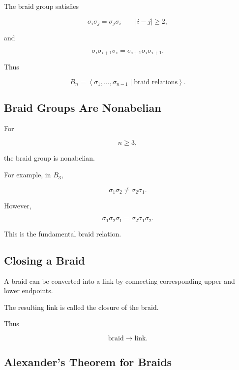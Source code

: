 The braid group satisfies

\[
\boxed{
\sigma_i\sigma_j
=
\sigma_j\sigma_i
\qquad
|i-j|\geq2,
}
\]

and

\[
\boxed{
\sigma_i\sigma_{i+1}\sigma_i
=
\sigma_{i+1}\sigma_i\sigma_{i+1}.
}
\]

Thus

\[
\boxed{
B_n
=
\left\langle
\sigma_1,\ldots,\sigma_{n-1}
\mid
\text{braid relations}
\right\rangle.
}
\]

\subsection{Braid Groups Are Nonabelian}
\label{subsec:braid-groups-nonabelian}

For

\[
n\geq3,
\]

the braid group is nonabelian.

For example, in \(B_3\),

\[
\sigma_1\sigma_2
\neq
\sigma_2\sigma_1.
\]

However,

\[
\boxed{
\sigma_1\sigma_2\sigma_1
=
\sigma_2\sigma_1\sigma_2.
}
\]

This is the fundamental braid relation.

\subsection{Closing a Braid}
\label{subsec:braid-closure}

A braid can be converted into a link by connecting corresponding upper and
lower endpoints.

The resulting link is called the closure of the braid.

Thus

\[
\boxed{
\text{braid}
\longrightarrow
\text{link}.
}
\]

\subsection{Alexander's Theorem for Braids}
\label{subsec:alexander-theorem-braids}

